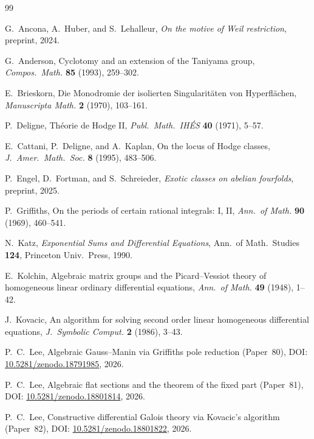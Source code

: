 \documentclass[11pt]{article}
\theoremstyle{plain}
\theoremstyle{definition}
\theoremstyle{remark}
\begin{document}
\begin{thebibliography}{99}

G.~Ancona, A.~Huber, and S.~Lehalleur,
\emph{On the motive of Weil restriction},
preprint, 2024.

G.~Anderson,
Cyclotomy and an extension of the Taniyama group,
\emph{Compos.\ Math.} \textbf{85} (1993), 259--302.

E.~Brieskorn,
Die Monodromie der isolierten Singularit\"aten von Hyperfl\"achen,
\emph{Manuscripta Math.} \textbf{2} (1970), 103--161.

P.~Deligne,
Th\'eorie de Hodge II,
\emph{Publ.\ Math.\ IH\'ES} \textbf{40} (1971), 5--57.

E.~Cattani, P.~Deligne, and A.~Kaplan,
On the locus of Hodge classes,
\emph{J.\ Amer.\ Math.\ Soc.} \textbf{8} (1995), 483--506.

P.~Engel, D.~Fortman, and S.~Schreieder,
\emph{Exotic classes on abelian fourfolds},
preprint, 2025.

P.~Griffiths,
On the periods of certain rational integrals: I, II,
\emph{Ann.\ of Math.} \textbf{90} (1969), 460--541.

N.~Katz,
\emph{Exponential Sums and Differential Equations},
Ann.\ of Math.\ Studies \textbf{124}, Princeton Univ.\ Press, 1990.

E.~Kolchin,
Algebraic matrix groups and the Picard--Vessiot theory of homogeneous
linear ordinary differential equations,
\emph{Ann.\ of Math.} \textbf{49} (1948), 1--42.

J.~Kovacic,
An algorithm for solving second order linear homogeneous differential
equations,
\emph{J.\ Symbolic Comput.} \textbf{2} (1986), 3--43.

P.~C.~Lee,
Algebraic Gauss--Manin via Griffiths pole reduction (Paper~80),
DOI: \href{https://doi.org/10.5281/zenodo.18791985}{10.5281/zenodo.18791985}, 2026.

P.~C.~Lee,
Algebraic flat sections and the theorem of the fixed part (Paper~81),
DOI: \href{https://doi.org/10.5281/zenodo.18801814}{10.5281/zenodo.18801814}, 2026.

P.~C.~Lee,
Constructive differential Galois theory via Kovacic's algorithm (Paper~82),
DOI: \href{https://doi.org/10.5281/zenodo.18801822}{10.5281/zenodo.18801822}, 2026.


\end{thebibliography}
\end{document}
